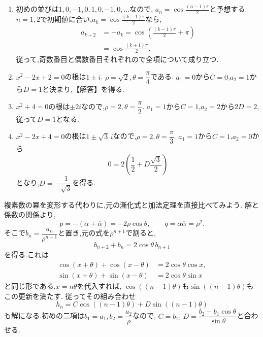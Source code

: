   \noindent{}\par\nobreak
  \begin{enumerate}[label=(\arabic*),parsep=3pt,format=\bookitemlink{example-complex-1}{solution}{problem}]
    \item 初めの並びは$1,0,-1,0,1,0,-1,0,\ldots$なので,
          $a_n=\cos\frac{(n-1)\pi}{2}$と予想する.
          $n=1,2$で初期値に合い,$a_k=\cos\frac{(k-1)\pi}{2}$なら,
          \[
            \begin{aligned}
              a_{k+2}&=-a_k=\cos\left(\frac{(k-1)\pi}{2}+\pi\right)\\
                     &=\cos\frac{(k+1)\pi}{2}.
            \end{aligned}
          \]
          従って,奇数番目と偶数番目それぞれので全項について成り立つ.
    \item {}$x^2-2x+2=0$の根は$1\pm i$.
          $\rho=\sqrt2,\theta=\dfrac{\pi}{4}$である.
          $a_1=0$から$C=0$,$a_2=1$から$D=1$と決まり,【解答】を得る.
    \item $x^2+4=0$の根は$\pm2i$なので,$\rho=2,\theta=\dfrac{\pi}{2}$.
          $a_1=1$から$C=1$,$a_2=2$から$2D=2$,従って$D=1$となる.
    \item $x^2-2x+4=0$の根は$1\pm\sqrt3\,i$なので,$\rho=2,\theta=\dfrac{\pi}{3}$.
          $a_1=1$から$C=1$,$a_2=0$から
          \[
            0=2\left(\frac12+D\frac{\sqrt3}{2}\right)
          \]
          となり,$D=-\dfrac{1}{\sqrt3}$を得る.
  \end{enumerate}

\label{解釈：虚数解と加法定理}
  複素数の冪を変形する代わりに,元の漸化式と加法定理を直接比べてみよう.
  解と係数の関係より,
  \[
    p=-(\alpha+\overline\alpha)=-2\rho\cos\theta,
    \qquad q=\alpha\overline\alpha=\rho^2.
  \]
  そこで$b_n=\dfrac{a_n}{\rho^{n-1}}$と置き,元の式を$\rho^{n+1}$で割ると,
  \[
    b_{n+2}+b_n=2\cos\theta\,b_{n+1}
  \]
  を得る.これは
  \[
    \begin{aligned}
      \cos(x+\theta)+\cos(x-\theta)&=2\cos\theta\cos x,\\
      \sin(x+\theta)+\sin(x-\theta)&=2\cos\theta\sin x
    \end{aligned}
  \]
  と同じ形である.$x=n\theta$を代入すれば,
  $\cos((n-1)\theta)$も$\sin((n-1)\theta)$もこの更新を満たす.
  従ってその組み合わせ
  \[
    h_n=C\cos((n-1)\theta)+D\sin((n-1)\theta)
  \]
  も解になる.初めの二項は$b_1=a_1,b_2=\dfrac{a_2}{\rho}$なので,
  $C=b_1$, $D=\dfrac{b_2-b_1\cos\theta}{\sin\theta}$と合わせる.

